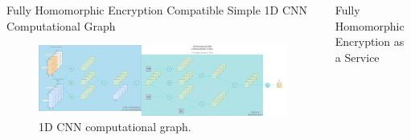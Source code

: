 \documentclass{beamer}
\begin{document}
\begin{frame}
    \begin{columns}
      \begin{column}{0.6\textwidth}
        \begin{block}{Fully Homomorphic Encryption Compatible Simple 1D CNN Computational Graph}
          \begin{figure}
            \centering
            \includegraphics[width=\textwidth]{encrypted_cnn.png}
            \caption{1D CNN computational graph.}
            \label{fig:gan}
          \end{figure}
        \end{block}
      \end{column}
      \begin{column}{0.3\textwidth}
        \begin{block}{Fully Homomorphic Encryption as a Service}
        \end{block}
      \end{column}
    \end{columns}


\end{frame}
\end{document}
